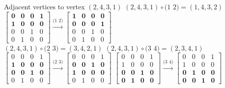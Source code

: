 \documentclass{beamer}
\theoremstyle{plain}
\theoremstyle{definition}
\begin{document}
\begin{frame}{Adjacent vertices to vertex $(2,4,3,1)$}
     $(2,4,3,1) \circ (1$ $2) = (1,4,3,2)$ \\ \vspace{0.3cm}
    $\begin{bmatrix}
        \mathbf{0} &  \mathbf{0} &  \mathbf{0} & \mathbf{1} \\ \mathbf{1} &  \mathbf{0} &  \mathbf{0} & \mathbf{0} \\ 0 & 0 & 1 & 0 \\ 0 & 1 & 0 & 0
    \end{bmatrix}  \stackrel{\text{(1 2)}}{\longrightarrow} \begin{bmatrix}
        \mathbf{1} &  \mathbf{0} &  \mathbf{0} & \mathbf{0} \\ \mathbf{0} &  \mathbf{0} &  \mathbf{0} & \mathbf{1} \\ 0 & 0 & 1 & 0 \\ 0 & 1 & 0 & 0
    \end{bmatrix}$  \\ \vspace{0.3cm}
    $(2,4,3,1) \circ (2$ $3) = (3,4,2,1)$ \hspace{1.7cm} $(2,4,3,1) \circ (3$ $4) = (2,3,4,1)$  \\ \vspace{0.3cm}
    $\begin{bmatrix}
       0 &  0 &  0 & 1 \\ \mathbf{1} &  \mathbf{0} &  \mathbf{0} & \mathbf{0} \\\mathbf{0} &  \mathbf{0} &  \mathbf{1} & \mathbf{0}\\ 0 & 1 & 0 & 0
    \end{bmatrix}  \stackrel{\text{(2 3)}}{\longrightarrow} \begin{bmatrix}
        0 & 0 & 0 & 1 \\ \mathbf{0} &  \mathbf{0} &  \mathbf{1} & \mathbf{0} \\\mathbf{1} &  \mathbf{0} &  \mathbf{0} & \mathbf{0} \\ 0 & 1 & 0 & 0
    \end{bmatrix}$\hspace{0.5cm} $\begin{bmatrix}
        0 & 0 & 0 & 1 \\ 1 & 0 & 0 & 0 \\ \mathbf{0} &  \mathbf{0} &  \mathbf{1} & \mathbf{0} \\ \mathbf{0} &  \mathbf{1} &  \mathbf{0} & \mathbf{0} 
    \end{bmatrix} \stackrel{\text{(3 4)}}{\longrightarrow}   \begin{bmatrix}
        0 & 0 & 0 & 1 \\ 1 & 0 & 0 & 0 \\ \mathbf{0} &  \mathbf{1} &  \mathbf{0} & \mathbf{0} \\ \mathbf{0} &  \mathbf{0} &  \mathbf{1} & \mathbf{0} 
    \end{bmatrix}$\vspace{0.3cm}
\end{frame}
\end{document}
